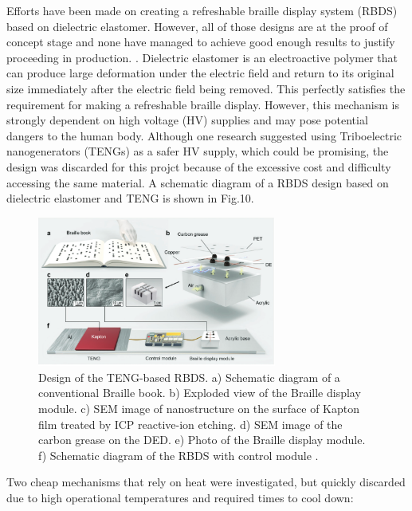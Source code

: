 Efforts have been made on creating a refreshable braille display system (RBDS) based on dielectric elastomer. However, all of those designs are at the proof of concept stage and none have managed to achieve good enough results to justify proceeding in production. \cite{qu_refreshable_2021}.
Dielectric elastomer is an electroactive polymer that can produce large deformation under the electric field and return to its original size immediately after the electric field being removed.
This perfectly satisfies the requirement for making a refreshable braille display. 
However, this mechanism is strongly dependent on high voltage (HV) supplies and may pose potential dangers to the human body.
Although one research suggested using Triboelectric nanogenerators (TENGs) as a safer HV supply, which could be promising, the design was discarded for this projct because of the excessive cost and difficulty accessing the same material. 
A schematic diagram of a RBDS design based on dielectric elastomer and TENG is shown in Fig.10.

\begin{figure}[h]\centering
    \includegraphics[width=0.7\textwidth]{figures/teng.png}
    \caption[Dielectric elastomer Braille display]{Design of the TENG-based RBDS. a) Schematic diagram of a conventional Braille book. b) Exploded view of the Braille display module. c) SEM image of nanostructure on the surface of Kapton film treated by ICP reactive-ion etching. d) SEM image of the carbon grease on the DED. e) Photo of the Braille display module. f) Schematic diagram of the RBDS with control module \cite{qu_refreshable_2021}.}
    \label{fig:teng.png}
\end{figure}

Two cheap mechanisms that rely on heat were investigated, but quickly discarded due to high operational temperatures and required times to cool down:

